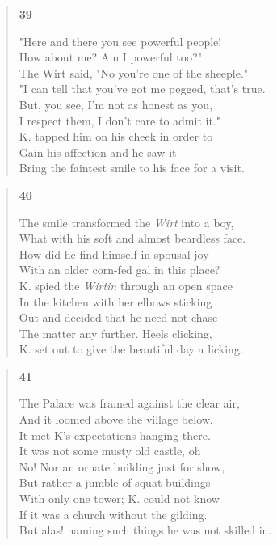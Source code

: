 \documentclass{article}
\begin{document}
\begin{verse}
  \begin{center}
    \textbf{39} \\
  \end{center}
  "Here and there you see powerful people! \\
  How about me? Am I powerful too?" \\
  The Wirt said, "No you're one of the sheeple." \\
  "I can tell that you've got me pegged, that's true. \\
  But, you see, I'm not as honest as you, \\
  I respect them, I don't care to admit it." \\
  K. tapped him on his cheek in order to \\
  Gain his affection and he saw it \\
  Bring the faintest smile to his face for a visit.
\end{verse}
\newpage
\begin{verse}
  \begin{center}
    \textbf{40} \\
  \end{center}
  The smile transformed the \textit{Wirt} into a boy, \\
  What with his soft and almost beardless face. \\
  How did he find himself in spousal joy \\
  With an older corn-fed gal in this place? \\
  K. spied the \textit{Wirtin} through an open space \\
  In the kitchen with her elbows sticking \\
  Out and decided that he need not chase \\
  The matter any further. Heels clicking, \\
  K. set out to give the beautiful day a licking.
\end{verse}

\begin{verse}
  \begin{center}
    \textbf{41} \\
  \end{center}
  The Palace was framed against the clear air, \\
  And it loomed above the village below. \\
  It met K's expectations hanging there. \\
  It was not some musty old castle, oh \\
  No! Nor an ornate building just for show, \\
  But rather a jumble of squat buildings \\
  With only one tower; K. could not know \\
  If it was a church without the gilding. \\
  But alas! naming such things he was not skilled in.
\end{verse}
\end{document}
